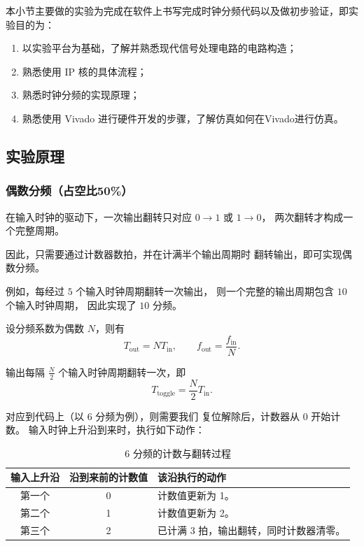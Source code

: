 

本小节主要做的实验为完成在软件上书写完成时钟分频代码以及做初步验证，即实验目的为：
\begin{enumerate}
    \item 以实验平台为基础，了解并熟悉现代信号处理电路的电路构造；
    \item 熟悉使用 IP 核的具体流程；
    \item 熟悉时钟分频的实现原理；
    \item 熟悉使用 Vivado 进行硬件开发的步骤，了解仿真如何在Vivado进行仿真。
\end{enumerate}

\subsection{实验原理}


\subsubsection{偶数分频（占空比50\%）}


在输入时钟的驱动下，一次输出翻转只对应
$0\rightarrow 1$ 或 $1\rightarrow 0$，
两次翻转才构成一个完整周期。

因此，只需要通过计数器数拍，并在计满半个输出周期时
翻转输出，即可实现偶数分频。

例如，每经过 $5$ 个输入时钟周期翻转一次输出，
则一个完整的输出周期包含 $10$ 个输入时钟周期，
因此实现了 $10$ 分频。

设分频系数为偶数 $N$，则有
\[
T_{\mathrm{out}} = N T_{\mathrm{in}},
\qquad
f_{\mathrm{out}} = \frac{f_{\mathrm{in}}}{N}.
\]

输出每隔 $\frac{N}{2}$ 个输入时钟周期翻转一次，即
\[
T_{\mathrm{toggle}} = \frac{N}{2}T_{\mathrm{in}}.
\]

对应到代码上（以 6 分频为例），则需要我们
复位解除后，计数器从 $0$ 开始计数。
输入时钟上升沿到来时，执行如下动作：

\begin{table}[H]
  \centering
  \caption{6 分频的计数与翻转过程}
  \begin{tabularx}{\textwidth}{ccX}
    \toprule
    输入上升沿 & 沿到来前的计数值 & 该沿执行的动作 \\
    \midrule
    第一个 & 0 & 计数值更新为 1。 \\
    第二个 & 1 & 计数值更新为 2。 \\
    第三个 & 2 & 已计满 3 拍，输出翻转，同时计数器清零。 \\
    \bottomrule
  \end{tabularx}
\end{table}

